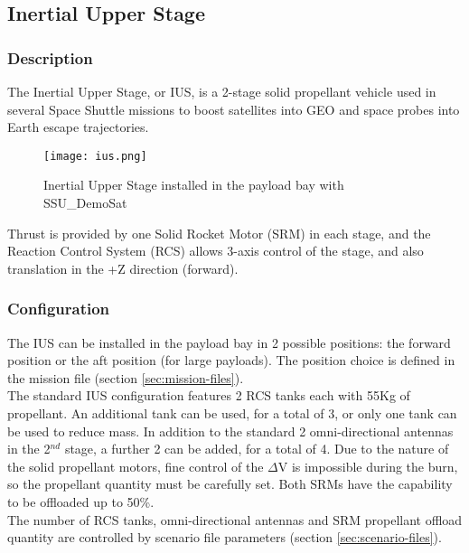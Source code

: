 \documentclass[Space_Shuttle_Ultra_Manual.tex]{subfiles}
\begin{document}
\subsection{Inertial Upper Stage}
\begin{multicols*}{2}
\renewcommand{\cfttoctitlefont}{\bf}
\localtableofcontents
\subsubsection{Description}
\noindent
The Inertial Upper Stage, or IUS, is a 2-stage solid propellant vehicle used in several Space Shuttle missions to boost satellites into GEO and space probes into Earth escape trajectories.
\\
\begin{figure}[H]
	\centering
	\captionsetup{justification=centering}
  \texttt{[image: ius.png]}
  \caption{Inertial Upper Stage installed in the payload bay with SSU\_DemoSat}
  \label{fig:ius}
\end{figure}
\noindent
Thrust is provided by one Solid Rocket Motor (SRM) in each stage, and the Reaction Control System (RCS) allows 3-axis control of the stage, and also translation in the +Z direction (forward).\\

\subsubsection{Configuration}
\noindent
The IUS can be installed in the payload bay in 2 possible positions: the forward position or the aft position (for large payloads). The position choice is defined in the mission file (section \ref{sec:mission-files}).\\
The standard IUS configuration features 2 RCS tanks each with 55Kg of propellant. An additional tank can be used, for a total of 3, or only one tank can be used to reduce mass. In addition to the standard 2 omni-directional antennas in the 2$^{nd}$ stage, a further 2 can be added, for a total of 4. Due to the nature of the solid propellant motors, fine control of the $\Delta$V is impossible during the burn, so the propellant quantity must be carefully set. Both SRMs have the capability to be offloaded up to 50\%.\\
The number of RCS tanks, omni-directional antennas and SRM propellant offload quantity are controlled by scenario file parameters (section \ref{sec:scenario-files}).


\end{multicols*}
\end{document}
